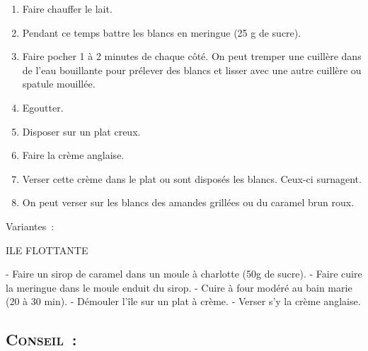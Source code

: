\begin{enumerate}
\item Faire chauffer le lait.

\item Pendant ce temps battre les blancs en meringue (25 g de sucre).

\item Faire pocher 1 à 2 minutes de chaque côté. On peut tremper une cuillère dans de l'eau bouillante pour prélever des blancs et lisser avec une autre cuillère ou spatule mouillée.

\item Egoutter.

\item Disposer sur un plat creux.

\item Faire la crème anglaise.

\item Verser cette crème dans le plat ou sont disposés les blancs. Ceux-ci surnagent.

\item On peut verser sur les blancs des amandes grillées ou du caramel brun roux.

\end{enumerate}

Variantes :

ILE FLOTTANTE

- Faire un sirop de caramel dans un moule à charlotte (50g de sucre).
- Faire cuire la meringue dans le moule enduit du sirop.
- Cuire à four modéré au bain marie (20 à 30 min).
- Démouler l’île sur un plat à crème.
- Verser s’y la crème anglaise.


\subsection*{\textsc{Conseil~:}}


